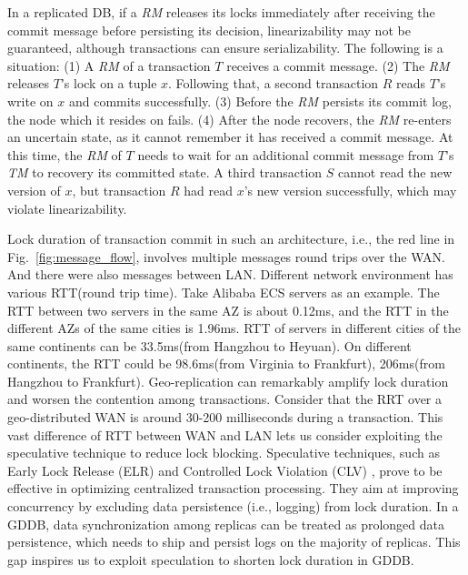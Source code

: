 \documentclass[conference]{IEEEtran}
\begin{document}
In a replicated DB, if a \emph{RM} releases its locks immediately after receiving the commit message before persisting its decision, linearizability may not be guaranteed, although transactions can ensure serializability.
The following is a situation:
(1) A \emph{RM} of a transaction ${T}$ receives a commit message.
(2) The \emph{RM} releases ${T}$'s lock on a tuple ${x}$. Following that,
a second transaction ${R}$ reads ${T}$'s write on ${x}$ and commits successfully.
(3) Before the \emph{RM} persists its commit log, the node which it resides on fails. 
(4) After the node recovers, the \emph{RM} re-enters an uncertain state, as it cannot remember it has received a commit message. At this time, the \emph{RM} of ${T}$ needs to wait for an additional commit message from ${T}$'s \emph{TM} to recovery its committed state.
A third transaction ${S}$ cannot read the new version of ${x}$,
but transaction ${R}$ had read ${x}$'s new version successfully, which may violate linearizability.

Lock duration of transaction commit in such an architecture, i.e., the red line in Fig.~\ref{fig:message_flow}, involves multiple messages round trips over the WAN.
And there were also messages between LAN.
Different network environment has various RTT(round trip time).
Take Alibaba ECS servers as an example.
The RTT between two servers in the same AZ is about 0.12ms, and the RTT in the different AZs of the same cities is 1.96ms.
RTT of servers in different cities of the same continents can be 33.5ms(from Hangzhou to Heyuan).
On different continents, the RTT could be 98.6ms(from Virginia to Frankfurt), 206ms(from Hangzhou to Frankfurt).
Geo-replication can remarkably amplify lock duration and worsen the contention among transactions.
Consider that the RRT over a geo-distributed WAN is around 30-200 milliseconds during a transaction. 
This vast difference of RTT between WAN and LAN lets us consider exploiting the speculative technique to reduce lock blocking.
Speculative techniques, such as Early Lock Release (ELR) \cite{EfficientLocking:conf/vldb/KimuraGK12} and Controlled Lock Violation (CLV)
\cite{CLV:conf/sigmod/GraefeLKTV13}, prove to be effective in optimizing centralized transaction processing.
They aim at improving concurrency by excluding data persistence (i.e., logging) from lock duration.
In a GDDB, data synchronization among replicas can be treated as prolonged data persistence, which needs to ship and persist logs on the majority of replicas.
This gap inspires us to exploit speculation to shorten lock duration in GDDB.
\end{document}

